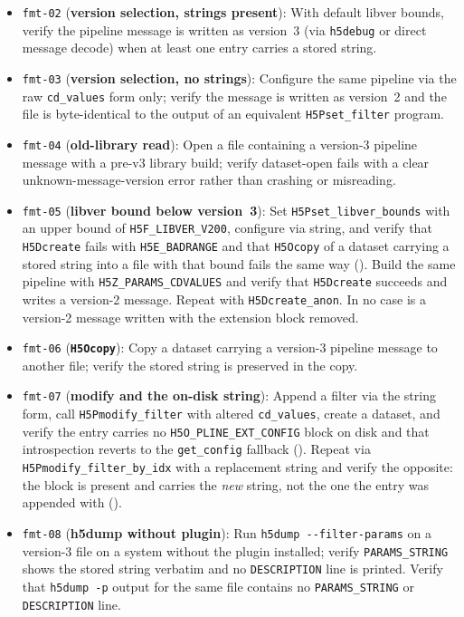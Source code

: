 \documentclass[../RFC-HDFG-2026-001.tex]{subfiles}
\begin{document}
\begin{itemize}
  subnormal literal: glibc raises \texttt{ERANGE} on underflow to a
  subnormal even though the conversion succeeded and returned the correctly
  rounded value.  Overflow to $\pm$\texttt{HUGE\_VAL} and underflow to zero
  must still be rejected.
\item \texttt{fmt-02} (\textbf{version selection, strings present}): With
  default libver bounds, verify the pipeline message is written as
  version~3 (via \texttt{h5debug} or direct message decode) when at least
  one entry carries a stored string.
\item \texttt{fmt-03} (\textbf{version selection, no strings}): Configure the
  same pipeline via the raw \texttt{cd\_values} form only; verify the
  message is written as version~2 and the file is byte-identical to the
  output of an equivalent \texttt{H5Pset\_filter} program.
\item \texttt{fmt-04} (\textbf{old-library read}): Open a file containing a
  version-3 pipeline message with a pre-v3 library build; verify
  dataset-open fails with a clear unknown-message-version error rather
  than crashing or misreading.
\item \texttt{fmt-05} (\textbf{libver bound below version~3}): Set
  \texttt{H5Pset\_libver\_bounds} with an upper bound of
  \texttt{H5F\_LIBVER\_V200}, configure via string, and verify that
  \texttt{H5Dcreate} fails with \texttt{H5E\_BADRANGE} and that
  \texttt{H5Ocopy} of a dataset carrying a stored string into a file with
  that bound fails the same way ().  Build
  the same pipeline with \texttt{H5Z\_PARAMS\_CDVALUES} and verify that
  \texttt{H5Dcreate} succeeds and writes a version-2 message.  Repeat with
  \texttt{H5Dcreate\_anon}.  In no case is a version-2 message written with
  the extension block removed.
\item \texttt{fmt-06} (\textbf{\texttt{H5Ocopy}}): Copy a dataset carrying a
  version-3 pipeline message to another file; verify the stored string is
  preserved in the copy.
\item \texttt{fmt-07} (\textbf{modify and the on-disk string}): Append a
  filter via the string form, call \texttt{H5Pmodify\_filter} with altered
  \texttt{cd\_values}, create a dataset, and verify the entry carries no
  \texttt{H5O\_PLINE\_EXT\_CONFIG} block on disk and that introspection
  reverts to the \texttt{get\_config} fallback
  ().  Repeat via
  \texttt{H5Pmodify\_filter\_by\_idx} with a replacement string and verify
  the opposite: the block is present and carries the \emph{new} string, not
  the one the entry was appended with ().
\item \texttt{fmt-08} (\textbf{h5dump without plugin}): Run
  \texttt{h5dump~-{}-filter-params} on a version-3 file on a system without
  the plugin installed; verify \texttt{PARAMS\_STRING} shows the stored
  string verbatim and no \texttt{DESCRIPTION} line is printed.  Verify that
  \texttt{h5dump~-p} output for the same file contains no
  \texttt{PARAMS\_STRING} or \texttt{DESCRIPTION} line.
\end{itemize}
\end{document}
